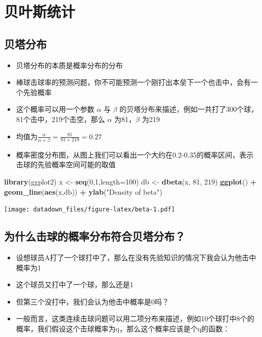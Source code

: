 \documentclass[]{book}
\newenvironment{Shaded}{\begin{snugshade}}{\end{snugshade}}
\newcommand{\DataTypeTok}[1]{\textcolor[rgb]{0.13,0.29,0.53}{#1}}
\newcommand{\DecValTok}[1]{\textcolor[rgb]{0.00,0.00,0.81}{#1}}
\newcommand{\KeywordTok}[1]{\textcolor[rgb]{0.13,0.29,0.53}{\textbf{#1}}}
\newcommand{\NormalTok}[1]{#1}
\newcommand{\OperatorTok}[1]{\textcolor[rgb]{0.81,0.36,0.00}{\textbf{#1}}}
\newcommand{\StringTok}[1]{\textcolor[rgb]{0.31,0.60,0.02}{#1}}
\providecommand{\tightlist}{%
  \setlength{\itemsep}{0pt}\setlength{\parskip}{0pt}}
\begin{document}
\chapter{贝叶斯统计}

\section{贝塔分布}

\begin{itemize}
\item
  贝塔分布的本质是概率分布的分布
\item
  棒球击球率的预测问题，你不可能预测一个刚打出本垒下一个也击中，会有一个先验概率
\item
  这个概率可以用一个参数 \(\alpha\) 与 \(\beta\) 的贝塔分布来描述，例如一共打了300个球，81个击中，219个击空，那么 \(\alpha\) 为81，\(\beta\) 为219
\item
  均值为\(\frac{\alpha}{\alpha + \beta} = \frac{81}{81+219} = 0.27\)
\item
  概率密度分布图，从图上我们可以看出一个大约在0.2-0.35的概率区间，表示击球的先验概率空间可能的取值
\end{itemize}

\begin{Shaded}
\begin{Highlighting}[]
\KeywordTok{library}\NormalTok{(ggplot2)}
\NormalTok{x <-}\StringTok{ }\KeywordTok{seq}\NormalTok{(}\DecValTok{0}\NormalTok{,}\DecValTok{1}\NormalTok{,}\DataTypeTok{length=}\DecValTok{100}\NormalTok{)}
\NormalTok{db <-}\StringTok{ }\KeywordTok{dbeta}\NormalTok{(x, }\DecValTok{81}\NormalTok{, }\DecValTok{219}\NormalTok{)}
\KeywordTok{ggplot}\NormalTok{() }\OperatorTok{+}\StringTok{ }\KeywordTok{geom_line}\NormalTok{(}\KeywordTok{aes}\NormalTok{(x,db)) }\OperatorTok{+}\StringTok{ }\KeywordTok{ylab}\NormalTok{(}\StringTok{"Density of beta"}\NormalTok{)}
\end{Highlighting}
\end{Shaded}

\texttt{[image: datadown\_files/figure-latex/beta-1.pdf]}

\section{为什么击球的概率分布符合贝塔分布？}

\begin{itemize}
\tightlist
\item
  设想球员A打了一个球打中了，那么在没有先验知识的情况下我会认为他击中概率为1
\item
  这个球员又打中了一个球，那么还是1
\item
  但第三个没打中，我们会认为他击中概率是0吗？
\item
  一般而言，这类连续击球问题可以用二项分布来描述，例如10个球打中8个的概率，我们假设这个击球概率为q，那么这个概率应该是个q的函数：
\end{itemize}
\end{document}
